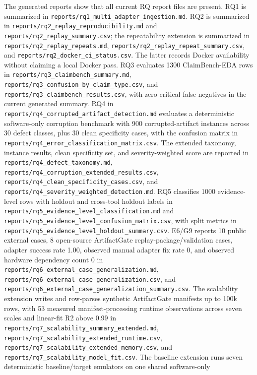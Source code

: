 \documentclass[preprint,12pt]{elsarticle}
\begin{document}
The generated reports show that all current RQ report files are present. RQ1 is
summarized in \texttt{reports/rq1\_multi\_adapter\_ingestion.md}. RQ2 is
summarized in \texttt{reports/rq2\_replay\_reproducibility.md} and
\texttt{reports/rq2\_replay\_summary.csv}; the repeatability extension is
summarized in \texttt{reports/rq2\_replay\_repeats.md},
\texttt{reports/rq2\_replay\_repeat\_summary.csv}, and
\texttt{reports/rq2\_docker\_ci\_status.csv}. The latter records Docker
availability without claiming a local Docker pass. RQ3 evaluates 1300 ClaimBench-EDA
rows in \texttt{reports/rq3\_claimbench\_summary.md},
\texttt{reports/rq3\_confusion\_by\_claim\_type.csv}, and
\texttt{reports/rq3\_claimbench\_results.csv}, with zero critical false
negatives in the current generated summary. RQ4 in
\texttt{reports/rq4\_corrupted\_artifact\_detection.md} evaluates a
deterministic software-only corruption benchmark with 900 corrupted-artifact
instances across 30 defect classes, plus 30 clean specificity cases, with the
confusion matrix in
\texttt{reports/rq4\_error\_classification\_matrix.csv}. The extended
taxonomy, instance results, clean specificity set, and severity-weighted score
are reported in \texttt{reports/rq4\_defect\_taxonomy.md},
\texttt{reports/rq4\_corruption\_extended\_results.csv},
\texttt{reports/rq4\_clean\_specificity\_cases.csv}, and
\texttt{reports/rq4\_severity\_weighted\_detection.md}. RQ5 classifies 1000
evidence-level rows with holdout and cross-tool holdout labels in
\texttt{reports/rq5\_evidence\_level\_classification.md} and
\texttt{reports/rq5\_evidence\_level\_confusion\_matrix.csv}, with split
metrics in \texttt{reports/rq5\_evidence\_level\_holdout\_summary.csv}. E6/G9
reports 10 public external cases, 8 open-source ArtifactGate
replay-package/validation cases, adapter success rate 1.00, observed manual
adapter fix rate 0, and observed hardware dependency count 0
in \texttt{reports/rq6\_external\_case\_generalization.md},
\texttt{reports/rq6\_external\_case\_generalization.csv}, and
\texttt{reports/rq6\_external\_case\_generalization\_summary.csv}. The
scalability extension writes and row-parses synthetic ArtifactGate manifests up
to 100k rows, with 53 measured manifest-processing runtime observations across
seven scales and linear-fit R2 above 0.99 in
\texttt{reports/rq7\_scalability\_summary\_extended.md},
\texttt{reports/rq7\_scalability\_extended\_runtime.csv},
\texttt{reports/rq7\_scalability\_extended\_memory.csv}, and
\texttt{reports/rq7\_scalability\_model\_fit.csv}. The baseline extension runs
seven deterministic baseline/target emulators on one shared software-only
\end{document}
